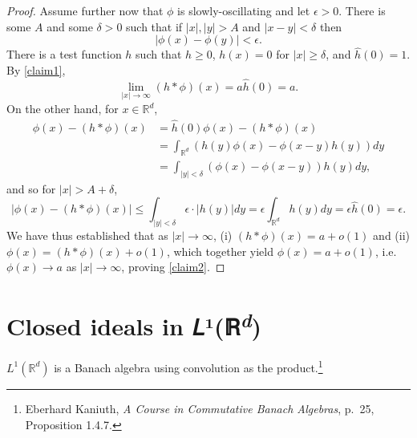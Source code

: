 \documentclass{article}
\theoremstyle{definition}
\begin{document}
\begin{proof}
Assume further now that $\phi$ is slowly-oscillating and let $\epsilon>0$. There is some $A$ and some $\delta>0$ such that
if $|x|,|y|>A$ and $|x-y|<\delta$ then
\[
|\phi(x)-\phi(y)|<\epsilon.
\]
There is a test function $h$ such that $h \geq 0$, $h(x)=0$ for $|x| \geq \delta$, and $\hat{h}(0)=1$.  By \eqref{claim1}, 
\[
\lim_{|x| \to \infty} (h*\phi)(x) = a \hat{h}(0) = a.
\]
On the other hand, for $x \in \mathbb{R}^d$,
\begin{align*}
\phi(x)-(h*\phi)(x)&= \hat{h}(0) \phi(x) - (h*\phi)(x) \\
& = \int_{\mathbb{R}^d}  (h(y) \phi(x) -\phi(x-y) h(y)) dy\\
&=\int_{|y|<\delta} (\phi(x)-\phi(x-y)) h(y) dy,
\end{align*}
and so for $|x|>A+\delta$,
\[
|\phi(x)-(h*\phi)(x)| \leq \int_{|y| < \delta} \epsilon \cdot  |h(y)| dy= \epsilon \int_{\mathbb{R}^d} h(y) dy = \epsilon \hat{h}(0) = \epsilon.
\]
We have thus established that as $|x| \to \infty$, (i) $(h*\phi)(x) = a +o(1)$ and (ii) $\phi(x)=(h*\phi)(x)+o(1)$, which together yield
$\phi(x)=a+o(1)$, i.e. $\phi(x) \to a$ as $|x| \to \infty$, proving \eqref{claim2}.
\end{proof}


\section{Closed ideals in 𝐿¹(ℝ\textsuperscript{\em d})}
$L^1(\mathbb{R}^d)$ is a Banach algebra using convolution as the product.\footnote{Eberhard Kaniuth, {\em A Course in Commutative Banach Algebras},
p.~25, Proposition 1.4.7.}
\end{document}
